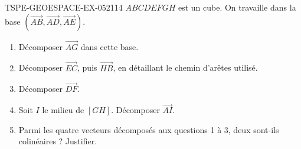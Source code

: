 \begin{exercice}{TSPE-GEOESPACE-EX-052}{1}{14}
$ABCDEFGH$ est un cube. On travaille dans la base
$(\vec{AB},\vec{AD},\vec{AE})$.
\begin{enumerate}
  \item Décomposer $\vec{AG}$ dans cette base.
  \item Décomposer $\vec{EC}$, puis $\vec{HB}$, en détaillant le chemin
        d'arêtes utilisé.
  \item Décomposer $\vec{DF}$.
  \item Soit $I$ le milieu de $[GH]$. Décomposer $\vec{AI}$.
  \item Parmi les quatre vecteurs décomposés aux questions 1 à 3, deux
        sont-ils colinéaires ? Justifier.
\end{enumerate}
\end{exercice}
